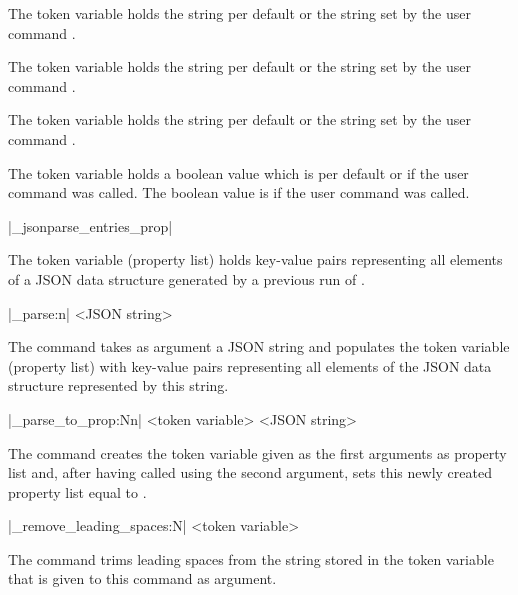 \documentclass[a4paper]{article}
\begin{document}
The token variable  holds the string  per default or the string set by the user command \macro{\JSONParseSetTrueString}.

{\sloppy The token variable  holds the string  per default or the string set by the user command \macro{\JSONParseSetFalseString}. \par}

The token variable  holds the string  per default or the string set by the user command \macro{\JSONParseSetNullString}.

The token variable  holds a boolean value which is  per default or if the user command \macro{\JSONParseSetArrayIndexZeroBased} was called. The boolean value is  if the user command \macro{\JSONParseSetArrayIndexOneBased} was called.

\begin{macrodef}
|\g_jsonparse_entries_prop|
\end{macrodef}
The token variable (property list)  holds key-value pairs representing all elements of a JSON data structure generated by a previous run of . 

\begin{macrodef}
|\jsonparse_parse:n| {<JSON string>}
\end{macrodef}
The command  takes as argument a JSON string and populates the token variable (property list)  with key-value pairs representing all elements of the JSON data structure represented by this string.
  
\begin{macrodef}
|\jsonparse_parse_to_prop:Nn| <token variable> {<JSON string>}
\end{macrodef}
The command  creates the token variable given as the first arguments as property list and, after having called  using the second argument, sets this newly created property list equal to .

\begin{macrodef}
|\jsonparse_remove_leading_spaces:N| <token variable>
\end{macrodef}
The command  trims leading spaces from the string stored in the token variable that is given to this command as argument.


\printchanges
\end{document}
